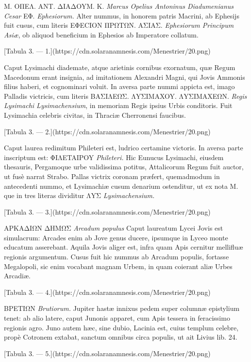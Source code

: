 \documentclass[a4paper, 11pt, oneside, polutonikogreek, latin]{article}
\begin{document}
M. OΠEΛ. ANT. ΔIAΔOYM. K. \emph{Marcus Opelius Antoninus Diadumenianus Cesar} EΦ. \emph{Ephesiorum.} Alter nummus, in honorem patris Macrini, ab Ephesijs fuit cusus, cum literis EΦECION ΠPΩTΩN. AΣIAΣ. \emph{Ephesiorum Principum Asiæ}, ob aliquod beneficium in Ephesios ab Imperatore collatum.

[Tabula 3. --- 1.](https://cdn.solaranamnesis.com/Menestrier/20.png)

Caput Lysimachi diademate, atque arietinis cornibus exornatum, quæ Regum Macedonum erant insignia, ad imitationem Alexandri Magni, qui Jovis Ammonis filius haberi, et cognominari voluit. In aversa parte nummi appicta est, imago Palladis victricis, cum literis BAΣIΛEΩΣ. ΛYΣIMAXOY. ΛYΣIMAXEΩN. \emph{Regis Lysimachi Lysimachensium}, in memoriam Regis ipsius Urbis conditoris. Fuit Lysimachia celebris civitas, in Thraciæ Cherronensi faucibus.

[Tabula 3. --- 2.](https://cdn.solaranamnesis.com/Menestrier/20.png)

Caput laurea redimitum Phileteri est, ludrico certamine victoris. In aversa parte inscriptum est: ΦIΛETAIPOY \emph{Phileteri.} Hic Eunucus Lysimachi, eiusdem thesauris, Pergamoque urbe validissima potitus, Attalicorum Regum fuit auctor, ut fusè narrat Strabo. Pallas victrix coronam præfert, quemadmodum in antecedenti nummo, et Lysimachiæ cusum denarium ostenditur, ut ex nota M. que in tres literas dividitur ΛYΣ \emph{Lysimachensium.}

[Tabula 3. --- 3.](https://cdn.solaranamnesis.com/Menestrier/20.png)

APKAΔIΩN ΔHMΩΣ \emph{Arcadum populus} Caput laureatum Lycei Jovis est simulacrum: Arcades enim ab Jove genus ducere, ipsumque in Lyceo monte educatum asserebant. Aquila Jovis aliger est, infra quam Apis cernitur mellifluæ regionis argumentum. Cusus fuit hic nummus ab Arcadum populis, fortasse Megalopoli, sic enim vocabant magnam Urbem, in quam coierant aliæ Urbes Arcadiæ.

[Tabula 3. --- 4.](https://cdn.solaranamnesis.com/Menestrier/20.png)

BPETIΩN \emph{Brutiorum.} Jupiter hastæ innixus pedem super columnæ epistylium tenet: ab alio latere, caput Junonis apparet, cum Apis tessera in feracissimo regionis agro. Juno autem hæc, sine dubio, Lacinia est, cuius templum celebre, propè Cotronem extabat, sanctum omnibus circa populis, ut ait Livius lib. 24.

[Tabula 3. --- 5.](https://cdn.solaranamnesis.com/Menestrier/20.png)
\end{document}
